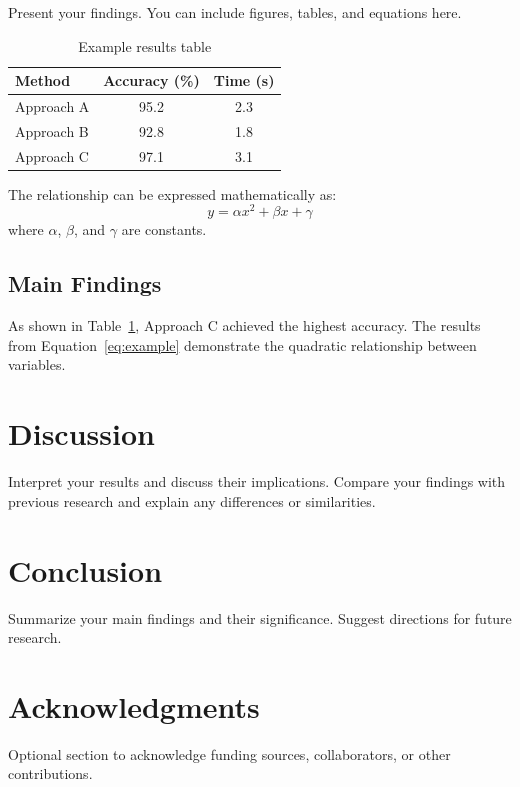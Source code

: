 \documentclass[12pt,a4paper]{article}
\begin{document}
Present your findings. You can include figures, tables, and equations here.

\begin{table}[htbp]
\centering
\caption{Example results table}
\label{tab:results}
\begin{tabular}{lcc}
\hline
\textbf{Method} & \textbf{Accuracy (\%)} & \textbf{Time (s)} \\
\hline
Approach A & 95.2 & 2.3 \\
Approach B & 92.8 & 1.8 \\
Approach C & 97.1 & 3.1 \\
\hline
\end{tabular}
\end{table}

The relationship can be expressed mathematically as:
\begin{equation}
y = \alpha x^2 + \beta x + \gamma
\label{eq:example}
\end{equation}
where $\alpha$, $\beta$, and $\gamma$ are constants.

\subsection{Main Findings}
\label{subsec:main-findings}

As shown in Table~\ref{tab:results}, Approach C achieved the highest accuracy. The results from Equation~\ref{eq:example} demonstrate the quadratic relationship between variables.

\section{Discussion}
\label{sec:discussion}

Interpret your results and discuss their implications. Compare your findings with previous research and explain any differences or similarities.

\section{Conclusion}
\label{sec:conclusion}

Summarize your main findings and their significance. Suggest directions for future research.

\section*{Acknowledgments}

Optional section to acknowledge funding sources, collaborators, or other contributions.



\end{document}
